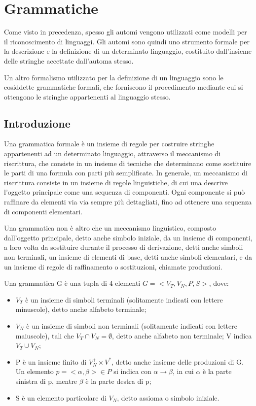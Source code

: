 \chapter{Grammatiche}
  Come visto in precedenza, spesso gli automi vengono utilizzati come modelli per il riconoscimento di linguaggi. Gli automi sono quindi uno strumento formale per la descrizione e la definizione di un determinato linguaggio, costituito dall'insieme delle stringhe accettate dall'automa stesso.

  Un altro formalismo utilizzato per la definizione di un linguaggio sono le cosiddette grammatiche formali, che forniscono il procedimento mediante cui si ottengono le stringhe appartenenti al linguaggio stesso. 
  
  \section{Introduzione}
  Una grammatica formale è un insieme di regole per costruire stringhe appartenenti ad un determinato linguaggio, attraverso il meccanismo di riscrittura, che consiste in un insieme di tecniche che determinano come sostituire le parti di una formula con parti più semplificate. In generale, un meccanismo di riscrittura consiste in un insieme di regole linguistiche, di cui una descrive l'oggetto principale come una sequenza di componenti. Ogni componente si può raffinare da elementi via via sempre più dettagliati, fino ad ottenere una sequenza di componenti elementari.

  Una grammatica non è altro che un meccanismo linguistico, composto dall'oggetto principale, detto anche simbolo iniziale, da un insieme di componenti, a loro volta da sostituire durante il processo di derivazione, detti anche simboli non terminali, un insieme di elementi di base, detti anche simboli elementari, e da un insieme di regole di raffinamento o sostituzioni, chiamate produzioni.

  \begin{definition} \label{definizione grammatica}
    Una grammatica G è una tupla di 4 elementi \(G = <V_T, V_N, P, S>\), dove:
    \begin{itemize}
      \item \(V_T\) è un insieme di simboli terminali (solitamente indicati con lettere minuscole), detto anche alfabeto terminale;
      \item \(V_N\) è un insieme di simboli non terminali (solitamente indicati con lettere maiuscole), tali che \(V_T \cap V_N = \emptyset\), detto anche alfabeto non terminale; V indica \(V_T\cup V_N\);
      \item P è un insieme finito di \(V_N^+\times V^*\), detto anche insieme delle produzioni di G. Un elemento \(p=<\alpha, \beta> \in P\) si indica con \(\alpha\to\beta\), in cui \(\alpha\) è la parte sinistra di p, mentre \(\beta\) è la parte destra di p;
      \item S è un elemento particolare di \(V_N\), detto assioma o simbolo iniziale. 
    \end{itemize}
  \end{definition}

